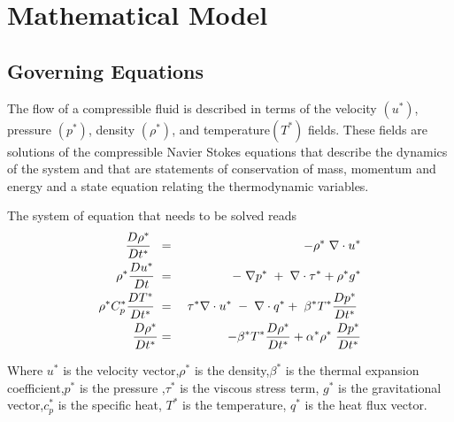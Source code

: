 \section{Mathematical Model}
\subsection{Governing Equations}
The flow of a compressible fluid is described in terms of the velocity $(u^*)$, pressure $(p^*)$, density $(\rho^*)$, and temperature$(T^*)$ fields. These fields are solutions of the compressible Navier Stokes equations that describe the dynamics of the system
and that are statements of conservation of mass, momentum and energy and a state equation relating the thermodynamic variables.  

The system of equation that needs to be solved reads
\begin{eqnarray}
\frac{D \rho^*}{D t^*}\hspace{1mm} \hspace{1mm} &=& - \rho^* \hspace{1mm}\nabla \cdot u^* \\
\rho^* \frac{D u^*}{D t} \hspace{1mm} &=& -\hspace{1mm}\nabla p^*\hspace{1mm}+\hspace{1mm}\nabla \cdot \tau^* + \rho^* g^* \\
\rho^* C_p^* \frac{D T^*}{D t^*} \hspace{1mm}&=&\hspace{1mm} \tau^* \nabla \cdot u^* \hspace{1mm}- \hspace{1mm}\nabla \cdot q^* + \hspace{1mm} \beta^* T^* \frac{D p^*}{D t^*}\hspace{1mm}\\
\frac{D \rho^*}{D t^*} &=& \hspace{1mm} - \beta^* T^* \frac{D \rho^*}{D t^*} + \alpha^* \rho^* \hspace{1mm}\frac{D p^*}{D t^*}
\end{eqnarray}

Where $u^*$ is the velocity vector,$\rho^*$ is the density,$\beta^*$ is the thermal expansion coefficient,$p^*$ is the pressure ,$\tau^*$ is the viscous stress term, $g^*$ is the gravitational vector,$c_p^*$ is the specific heat, $T^*$ is the temperature, $q^*$ is the heat flux vector. 

